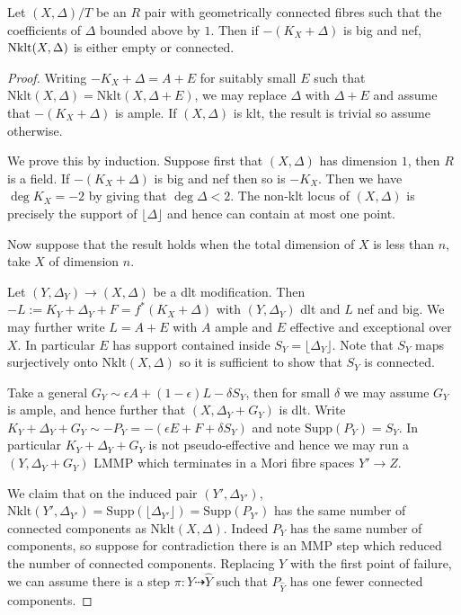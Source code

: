 \documentclass[a4paper,12pt]{book}
\newcommand{\D}{\Delta}
\newcommand{\nklt}{\text{Nklt}}
\begin{document}
\begin{theorem}\label{WLC}
	Let $(X,\Delta)/T$ be an $R$ pair with geometrically connected fibres such that the coefficients of $\Delta$ bounded above by $1$. Then if $-(K_{X}+\Delta)$ is big and nef, $\textup{Nklt}(X,\Delta)$ is either empty or connected.
\end{theorem}

\begin{proof}
	
	Writing $-K_{X}+\Delta=A+E$ for suitably small $E$ such that $\text{Nklt}(X,\Delta)=\text{Nklt}(X,\Delta+E)$, we may replace $\Delta$ with $\Delta+E$ and assume that $-(K_{X}+\Delta)$ is ample. If $(X,\Delta)$ is klt, the result is trivial so assume otherwise.
	
	We prove this by induction. Suppose first that $(X,\Delta)$ has dimension $1$, then $R$ is a field. If $-(K_{X}+\Delta)$ is big and nef then so is $-K_{X}$. Then we have $\deg K_{X} = -2$ by \cite[Corollary 2.8]{tanaka2018minimal} giving that $ \deg \Delta <2$. The non-klt locus of $(X,\Delta)$ is precisely the support of $\lfloor \D \rfloor$ and hence can contain at most one point.
	
	Now suppose that the result holds when the total dimension of $X$ is less than $n$, take $X$ of dimension $n$.
	
	Let $(Y,\D_{Y}) \to (X,\D)$ be a dlt modification. Then $-L:=K_{Y}+\D_{Y}+F=f^{*}(K_{X}+\D)$ with $(Y,\D_{Y})$ dlt and $L$ nef and big. We may further write $L=A+E$ with $A$ ample and $E$ effective and exceptional over $X$. In particular $E$ has support contained inside $S_{Y}=\lfloor \D_{Y} \rfloor$. Note that $S_{Y}$ maps surjectively onto $\nklt(X,\D)$ so it is sufficient to show that $S_{Y}$ is connected.
	
	Take a general $G_{Y} \sim \epsilon A +(1-\epsilon) L-\delta S_{Y}$, then for small $\delta$ we may assume $G_{Y}$ is ample, and hence further that $(X,\D_{Y}+G_{Y})$ is dlt. Write $K_{Y}+\D_{Y}+G_{Y}\sim - P_{Y}=-(\epsilon E + F + \delta S_{Y})$ and note $\text{Supp}(P_{Y})=S_{Y}$. In particular $K_{Y}+\D_{Y}+G_{Y}$ is not pseudo-effective and hence we may run a $(Y,\D_{Y}+G_{Y})$ LMMP which terminates in a Mori fibre spaces $Y' \to Z$. 
	
	We claim that on the induced pair $(Y',\D_{Y'})$, $\nklt(Y',\D_{Y'})=\text{Supp}(\lfloor \D_{Y'} \rfloor)=\text{Supp}(P_{Y'})$ has the same number of connected components as $\nklt(X,\Delta)$. Indeed $P_{Y}$ has the same number of components, so suppose for contradiction there is an MMP step which reduced the number of connected components. Replacing $Y$ with the first point of failure, we can assume there is a step $\pi: Y \dashrightarrow \hat{Y}$ such that $P_{\hat{Y}}$ has one fewer connected components. 
	

\end{proof}
\end{document}

